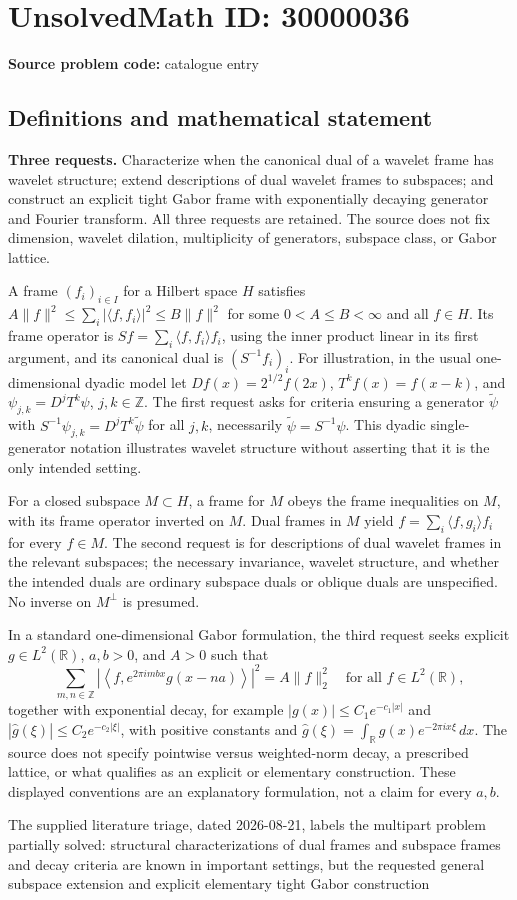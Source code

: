 \documentclass[11pt]{article}
\newcommand{\Z}{\mathbb{Z}}
\newcommand{\R}{\mathbb{R}}
\begin{document}
\section*{UnsolvedMath ID: 30000036}
\textbf{Source problem code:} catalogue entry
\subsection{Definitions and mathematical statement}
\textbf{Three requests.} Characterize when the canonical dual of a wavelet frame has wavelet structure; extend descriptions of dual wavelet frames to subspaces; and construct an explicit tight Gabor frame with exponentially decaying generator and Fourier transform. All three requests are retained. The source does not fix dimension, wavelet dilation, multiplicity of generators, subspace class, or Gabor lattice.\par A frame \((f_i)_{i\in I}\) for a Hilbert space \(H\) satisfies \(A\|f\|^2\le\sum_i|\langle f,f_i\rangle|^2\le B\|f\|^2\) for some \(0<A\le B<\infty\) and all \(f\in H\). Its frame operator is \(Sf=\sum_i\langle f,f_i\rangle f_i\), using the inner product linear in its first argument, and its canonical dual is \((S^{-1}f_i)_i\). For illustration, in the usual one-dimensional dyadic model let \(D f(x)=2^{1/2}f(2x)\), \(T^k f(x)=f(x-k)\), and \(\psi_{j,k}=D^jT^k\psi\), \(j,k\in\Z\). The first request asks for criteria ensuring a generator \(\widetilde\psi\) with \(S^{-1}\psi_{j,k}=D^jT^k\widetilde\psi\) for all \(j,k\), necessarily \(\widetilde\psi=S^{-1}\psi\). This dyadic single-generator notation illustrates wavelet structure without asserting that it is the only intended setting.\par For a closed subspace \(M\subset H\), a frame for \(M\) obeys the frame inequalities on \(M\), with its frame operator inverted on \(M\). Dual frames in \(M\) yield \(f=\sum_i\langle f,g_i\rangle f_i\) for every \(f\in M\). The second request is for descriptions of dual wavelet frames in the relevant subspaces; the necessary invariance, wavelet structure, and whether the intended duals are ordinary subspace duals or oblique duals are unspecified. No inverse on \(M^\perp\) is presumed.\par In a standard one-dimensional Gabor formulation, the third request seeks explicit \(g\in L^2(\R)\), \(a,b>0\), and \(A>0\) such that\[\sum_{m,n\in\Z}\left|\left\langle f,e^{2\pi i mbx}g(x-na)\right\rangle\right|^2=A\|f\|_2^2\quad\text{for all }f\in L^2(\R),\] together with exponential decay, for example \(|g(x)|\le C_1e^{-c_1|x|}\) and \(|\widehat g(\xi)|\le C_2e^{-c_2|\xi|}\), with positive constants and \(\widehat g(\xi)=\int_\R g(x)e^{-2\pi ix\xi}\,dx\). The source does not specify pointwise versus weighted-norm decay, a prescribed lattice, or what qualifies as an explicit or elementary construction. These displayed conventions are an explanatory formulation, not a claim for every \(a,b\).\par The supplied literature triage, dated 2026-08-21, labels the multipart problem partially solved: structural characterizations of dual frames and subspace frames and decay criteria are known in important settings, but the requested general subspace extension and explicit elementary tight Gabor construction 
\end{document}
